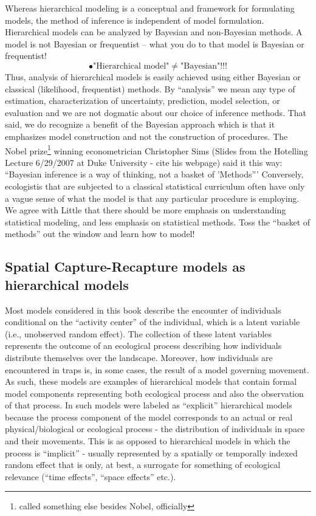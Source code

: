 Whereas hierarchical modeling is a conceptual and framework for
formulating models, the method of inference is independent of model
formulation. Hierarchical models can be analyzed by Bayesian and
non-Bayesian methods. A model is not Bayesian or frequentist -- what
you do to that model is Bayesian or frequentist!
\[
\bullet \mbox{"Hierarchical model"} \ne  \mbox{"Bayesian"}!!!
\]
Thus, analysis of hierarchical models is easily achieved using either
Bayesian or classical (likelihood, frequentist) methods. By
``analysis'' we mean any type of estimation, characterization of
uncertainty, prediction, model selection, or evaluation and we are not
dogmatic about our choice of inference methods. That said, we do
recognize a benefit of the Bayesian approach which is that it
emphasizes model construction and not the construction of
procedures. The Nobel prize\footnote{called something else besides
  Nobel, officially} winning econometrician Christopher Sims (Slides
from the Hotelling Lecture 6/29/2007 at Duke University - cite his
webpage) said it this way: ``Bayesian inference is a way of thinking,
not a basket of 'Methods''' Conversely, ecologistis that are subjected
to a classical statistical curriculum often have only a vague sense of
what the model is that any particular procedure is employing.  We
agree with Little \citet{little:2006} 
that there should be more emphasis on understanding statistical
modeling, and less emphasis on statistical methods.  Toss the ``basket
of methods'' out the window and learn how to model!



\subsection{Spatial Capture-Recapture models as hierarchical models}

Most models considered in this book describe the encounter of
individuals conditional on the ``activity center'' of the individual,
which is a latent variable (i.e., unobserved random effect).  The
collection of these latent variables represents the outcome of an
ecological process describing how individuals distribute themselves
over the landscape. Moreover, how individuals are encountered in traps
is, in some cases, the result of a model governing movement.  As such,
these models are examples of hierarchical models that contain formal
model components representing both ecological process and also the
observation of that process. In \citet{royle_dorazio:2008} such models
were labeled as ``explicit'' hierarchical models because the process
component of the model corresponds to an actual or real
physical/biological or ecological process - the distribution of
individuals in space and their movements.  This is as opposed to
hierarchical models in which the process is ``implicit'' - usually
represented by a spatially or temporally indexed random effect that is
only, at best, a surrogate for something of ecological relevance
(``time effects'', ``space effects'' etc.).

